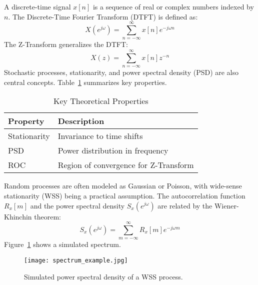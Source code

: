 \documentclass{article}
\begin{document}
A discrete-time signal $x[n]$ is a sequence of real or complex numbers indexed by $n$. The Discrete-Time Fourier Transform (DTFT) is defined as:
\begin{equation}
X(e^{j\omega}) = \sum_{n=-\infty}^{\infty} x[n] e^{-j\omega n}
\end{equation}
The Z-Transform generalizes the DTFT:
\begin{equation}
X(z) = \sum_{n=-\infty}^{\infty} x[n] z^{-n}
\end{equation}
Stochastic processes, stationarity, and power spectral density (PSD) are also central concepts. Table~\ref{tab:theory} summarizes key properties.
\begin{table}[h!]
\centering
\caption{Key Theoretical Properties}
\begin{tabular}{|l|l|}
\hline
Property & Description \\
\hline
Stationarity & Invariance to time shifts \\
PSD & Power distribution in frequency \\
ROC & Region of convergence for Z-Transform \\
\hline
\end{tabular}
\label{tab:theory}
\end{table}

Random processes are often modeled as Gaussian or Poisson, with wide-sense stationarity (WSS) being a practical assumption. The autocorrelation function $R_x[m]$ and the power spectral density $S_x(e^{j\omega})$ are related by the Wiener-Khinchin theorem:
\begin{equation}
S_x(e^{j\omega}) = \sum_{m=-\infty}^{\infty} R_x[m] e^{-j\omega m}
\end{equation}
Figure~\ref{fig:theory_fig} shows a simulated spectrum.
\begin{figure}[h!]
\centering
\texttt{[image: spectrum\_example.jpg]}
\caption{Simulated power spectral density of a WSS process.}
\label{fig:theory_fig}
\end{figure}
\end{document}
